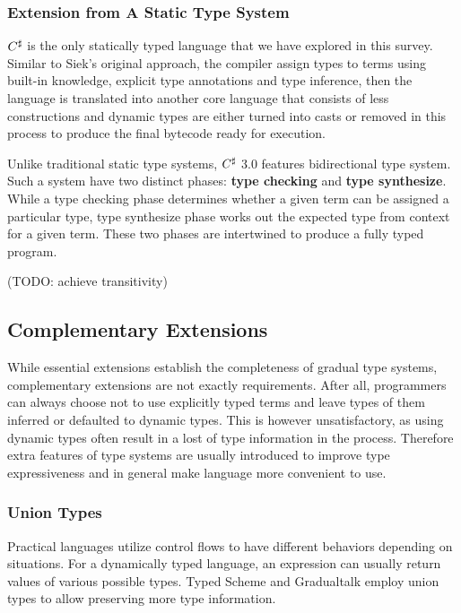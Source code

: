 \subsubsection{Extension from A Static Type System}

$C^\sharp$ is the only statically typed language that we have explored in this survey.
Similar to Siek's original approach, the compiler assign types to terms using built-in knowledge,
explicit type annotations and type inference, then the language is translated into another core
language that consists of less constructions and dynamic types are either turned into
casts or removed in this process to produce the final bytecode ready for execution.

Unlike traditional static type systems, $C^\sharp$ 3.0 features bidirectional type system.
Such a system have two distinct phases: \textbf{type checking} and \textbf{type synthesize}.
While a type checking phase determines whether a given term can be assigned a particular type,
type synthesize phase works out the expected type from context for a given term. These two phases
are intertwined to produce a fully typed program.

(TODO: achieve transitivity)

\subsection{Complementary Extensions}

While essential extensions establish the completeness of gradual type systems,
complementary extensions are not exactly requirements.
After all, programmers can always choose not to use explicitly typed terms and 
leave types of them inferred or defaulted to dynamic types.
This is however unsatisfactory, as using dynamic types often result in a lost of type information in the process.
Therefore extra features of type systems are usually introduced to improve type expressiveness and 
in general make language more convenient to use.

\subsubsection{Union Types}

Practical languages utilize control flows to have different behaviors depending on situations.
For a dynamically typed language, an expression can usually return values of various possible types.
Typed Scheme and Gradualtalk employ union types to allow preserving more type information.

